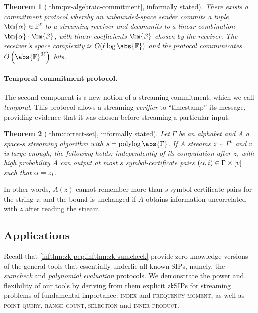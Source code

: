 \documentclass[a4paper,UKenglish,cleveref, autoref, thm-restate]{lipics-v2021}
\newtheorem{theorem}{Theorem}[section]
\theoremstyle{definition}
\newcommand{\zksip}{\textrm{zkSIP}}
\newcommand{\field}{\mathbb{F}}
\newcommand{\polylog}{\operatorname{polylog}}
\newcommand{\indexproblem}{\normalfont\textsc{index}\xspace}
\newcommand{\frequencymoment}{\normalfont\textsc{frequency-moment}\xspace}
\newcommand{\pointquery}{\normalfont\textsc{point-query}\xspace}
\newcommand{\rangecount}{\normalfont\textsc{range-count}\xspace}
\newcommand{\selection}{\normalfont\textsc{selection}\xspace}
\newcommand{\innerproductproblem}{\normalfont\textsc{inner-product}\xspace}
\newcommand{\vcommitlength}{v}
\newcommand{\vcommitstring}{z}
\newcommand{\evaluationpoint}{\bm{\fe2}}
\newcommand{\alphabet}{\Gamma}
\def\symbol#1{
    \ifnum#1=1
        \alpha
    \else
    \ifnum#1=2
        \beta
    \else
    \ifnum#1=3
        \gamma
    \fi\fi\fi
}
\def\fe#1{
    \ifnum#1=1
        \alpha
    \else
    \ifnum#1=2
        \beta
    \else
    \ifnum#1=3
        \gamma
    \fi\fi\fi
}
\begin{document}
\begin{theorem}[\cref{thm:pv-algebraic-commitment}, informally stated]
    \label{infthm:pv-commitment}
    There exists a commitment protocol whereby an unbounded-space sender commits a tuple $\bm{\fe1} \in \field^\ell$ to a streaming receiver and decommits to a linear combination $\bm{\fe1} \cdot \evaluationpoint$, with linear coefficients $\bm{\fe2}$ chosen by the receiver. The receiver's space complexity is $O (\ell \log \abs{\field})$ and the protocol communicates $\tilde O\left(\abs{\field}^{3\ell}\right)$ bits.
\end{theorem}

\paragraph*{Temporal commitment protocol\iflipics\else.\fi}
The second component is a new notion of a streaming commitment, which we call \emph{temporal}.
This protocol allows a streaming \emph{verifier} to ``timestamp'' its message, providing evidence that it was chosen before streaming a particular input.

\begin{theorem}[\cref{thm:correct-set}, informally stated]
    \label{infthm:correct-set}
    Let $\alphabet$ be an alphabet and $A$ a space-$s$ streaming algorithm with $s = \polylog \abs{\alphabet}$. If $A$ streams $z \sim \alphabet^\vcommitlength$ and $\vcommitlength$ is large enough, the following holds: \emph{independently of its computation} after $\vcommitstring$, with high probability $A$ can output at most $s$ symbol-certificate pairs $(\symbol1, i) \in \alphabet \times [\vcommitlength]$ such that $\symbol1 = \vcommitstring_i$.
\end{theorem}

In other words, $A(\vcommitstring)$ cannot remember more than $s$ symbol-certificate pairs for the string $\vcommitstring$; and the bound is unchanged if $A$ obtains information uncorrelated with $\vcommitstring$ after reading the stream.

\subsection{Applications}
\label{sec:applications}

Recall that \cref{infthm:zk-pep,infthm:zk-sumcheck} provide zero-knowledge versions of the general tools that essentially underlie all known SIPs, namely, the \emph{sumcheck} and \emph{polynomial evaluation} protocols. We demonstrate the power and flexibility of our tools by deriving from them explicit \zksip{}s for streaming problems of fundamental importance: \indexproblem and \frequencymoment, as well as \pointquery, \rangecount, \selection and \innerproductproblem.
\end{document}
